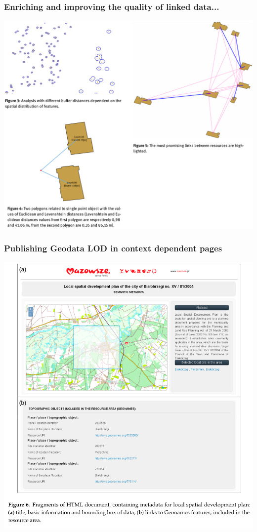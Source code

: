 \documentclass[10pt]{beamer}
\begin{document}
\begin{frame}
  \frametitle{Enriching and improving the quality of linked data...}

  \begin{center}
   \includegraphics[width=0.8\linewidth]{joining-objs.png}
 \end{center}
\end{frame}

\begin{frame}
  \frametitle{Publishing Geodata LOD in context dependent pages}
  \centering
  \includegraphics[width=0.7\linewidth]{integrating-og.png}
\end{frame}


\end{document}
